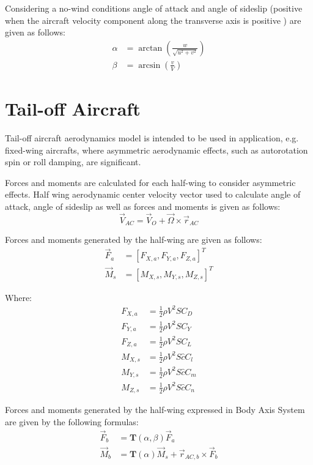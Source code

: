 Considering a no-wind conditions angle of attack and angle of sideslip (positive when the aircraft velocity component along the transverse axis is positive \cite{ISO-1151-1-1988}) are given as follows:
\begin{align}
  \alpha &= \arctan \left( \frac{w}{ \sqrt{ u^2 + v^2 } } \right) \\
  \beta  &= \arcsin \left( \frac{v}{V} \right)
\end{align}

\section{Tail-off Aircraft}

Tail-off aircraft aerodynamics model is intended to be used in application, e.g. fixed-wing aircrafts, where asymmetric aerodynamic effects, such as autorotation spin or roll damping, are significant.

Forces and moments are calculated for each half-wing to consider asymmetric effects. Half wing aerodynamic center velocity vector used to calculate angle of attack, angle of sideslip as well as forces and moments is given as follows:
\begin{equation}
  \label{eq-aero-v-ac}
  {\vec V}_{AC} = {\vec V}_O + {\vec \Omega} \times {\vec r}_{AC}
\end{equation}

Forces and moments generated by the half-wing are given as follows: \cite{StevensLewis1992}
\begin{align}
  {\vec F}_a &= \left[ F_{X,a}, F_{Y,a}, F_{Z,a} \right]^T \\
  {\vec M}_s &= \left[ M_{X,s}, M_{Y,s}, M_{Z,s} \right]^T
\end{align}

Where:
\begin{align}
  \label{eq-aero-fxa}
  F_{X,a} &= \frac{1}{2} \rho V^2 S C_D \\
  \label{eq-aero-fya}
  F_{Y,a} &= \frac{1}{2} \rho V^2 S C_Y \\
  \label{eq-aero-fza}
  F_{Z,a} &= \frac{1}{2} \rho V^2 S C_L \\
  M_{X,s} &= \frac{1}{2} \rho V^2 S \hat c C_l \\
  M_{Y,s} &= \frac{1}{2} \rho V^2 S \hat c C_m \\
  M_{Z,s} &= \frac{1}{2} \rho V^2 S \hat c C_n
\end{align}

Forces and moments generated by the half-wing expressed in Body Axis System are given by the following formulas:
\begin{align}
  \label{eq-aero-fb}
  {\vec F}_b &= {\boldsymbol T} \left( \alpha, \beta \right) {\vec F}_a \\
  {\vec M}_b &=
  {\boldsymbol T} \left( \alpha \right) {\vec M}_s
  +
  {\vec r}_{AC,b} \times {\vec F}_b
\end{align}

